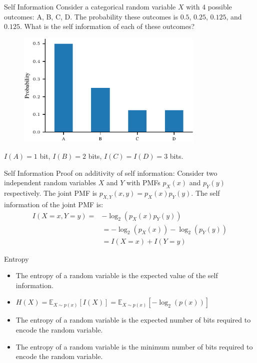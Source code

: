 \documentclass[handout]{beamer}
\begin{document}
\begin{frame}{Self Information}
    Consider a categorical random variable $X$ with $4$ possible outcomes: A, B, C, D. The probability these outcomes is $0.5$, $0.25$, $0.125$, and $0.125$. What is the self information of each of these outcomes?
    \begin{figure}
        \centering
        \includegraphics[width=0.8\textwidth]{notebooks/figures/information-theory/categorical-nonuniform.pdf}
        \label{fig:self_info_categorical_nonuniform}
    \end{figure}

    $I(A) = 1$ bit, $I(B) = 2$ bits, $I(C) = I(D) = 3$ bits.

\end{frame}

\begin{frame}{Self Information}
    Proof on additivity of self information:
    Consider two independent random variables $X$ and $Y$ with PMFs $p_X(x)$ and $p_Y(y)$ respectively. The joint PMF is $p_{X, Y}(x, y) = p_X(x)p_Y(y)$. The self information of the joint PMF is:
    \begin{align*}
        I(X=x, Y=y)=& -\log_2(p_X(x)p_Y(y)) \\
        &= -\log_2(p_X(x)) - \log_2(p_Y(y))\\ &= I(X=x) + I(Y=y)
    \end{align*}
    
\end{frame}

\begin{frame}{Entropy}
    \begin{itemize}
        \item The entropy of a random variable is the expected value of the self information.
        \item $H(X) = \mathbb{E}_{X \sim p(x)}[I(X)] = \mathbb{E}_{X \sim p(x)}[-\log_2(p(x))]$
        \item The entropy of a random variable is the expected number of bits required to encode the random variable.
        \item The entropy of a random variable is the minimum number of bits required to encode the random variable.
    \end{itemize}
    
\end{frame}
\end{document}
